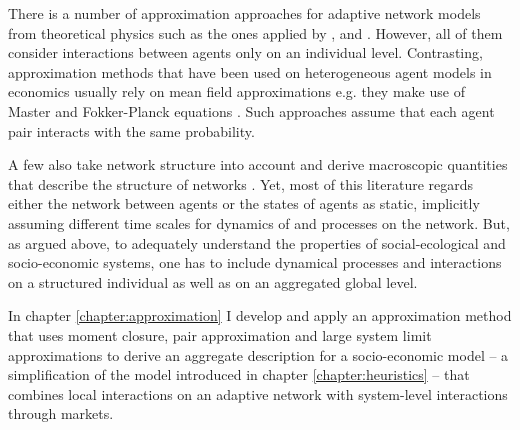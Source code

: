 There is a number of approximation approaches for adaptive network models from theoretical physics such as the ones applied by \cite{Rogers2013}, \cite{Wiedermann2015} and \cite{Min2017}. However, all of them consider interactions between agents only on an individual level. Contrasting, approximation methods that have been used on heterogeneous agent models in economics usually rely on mean field approximations e.g. they make use of Master and Fokker-Planck equations \citep{Aoki1998, Aoki2007, DelliGatti2000, DiGuilmi2008, Chiarella2011a, Landini2014}. Such approaches assume that each agent pair interacts with the same probability.

A few also take network structure into account and derive macroscopic quantities that describe the structure of networks \citep[e.g.][]{Alfarano2008a, Lux2016}.
Yet, most of this literature regards either the network between agents or the states of agents as static, implicitly assuming different time scales for dynamics of and processes on the network.
But, as argued above, to adequately understand the properties of social-ecological and socio-economic systems, one has to include dynamical processes and interactions on a structured individual as well as on an aggregated global level.

In chapter \ref{chapter:approximation} I develop and apply an approximation method that uses moment closure, pair approximation and large system limit approximations to derive an aggregate description for a socio-economic model -- a simplification of the model introduced in chapter \ref{chapter:heuristics} -- that combines local interactions on an adaptive network with system-level interactions through markets. 

